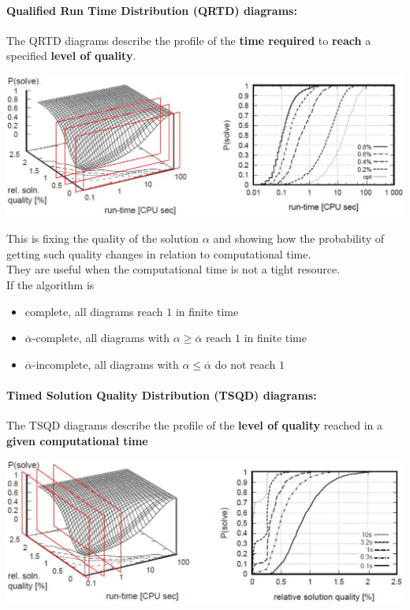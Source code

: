 \documentclass[11pt]{article}
\begin{document}
	\newpage
	
	\paragraph{Qualified Run Time Distribution (QRTD) diagrams:} The QRTD diagrams describe the profile of the \textbf{time required} to \textbf{reach} a specified \textbf{level of quality}.
	\begin{center}
		\includegraphics[width=\columnwidth]{img/QRTD1}
	\end{center}
	
	This is fixing the quality of the solution $\alpha$ and showing how the probability of getting such quality changes in relation to computational time.\\
	
	They are useful when the computational time is not a tight resource.\\
	
	If the algorithm is
	\begin{itemize}
		\item complete, all diagrams reach $1$ in finite time
		\item $\overline{\alpha}$-complete, all diagrams with $\alpha \geq \overline{\alpha}$ reach $1$ in finite time
		\item $\overline{\alpha}$-incomplete, all diagrams with $\alpha \leq \overline{\alpha}$ do not reach $1$
	\end{itemize}
	
	\newpage
	
	\paragraph{Timed Solution Quality Distribution (TSQD) diagrams:} The TSQD diagrams describe the profile of the \textbf{level of quality} reached in a \textbf{given computational time}
	\begin{center}
		\includegraphics[width=\columnwidth]{img/TSQD1}
	\end{center}
	
\end{document}

